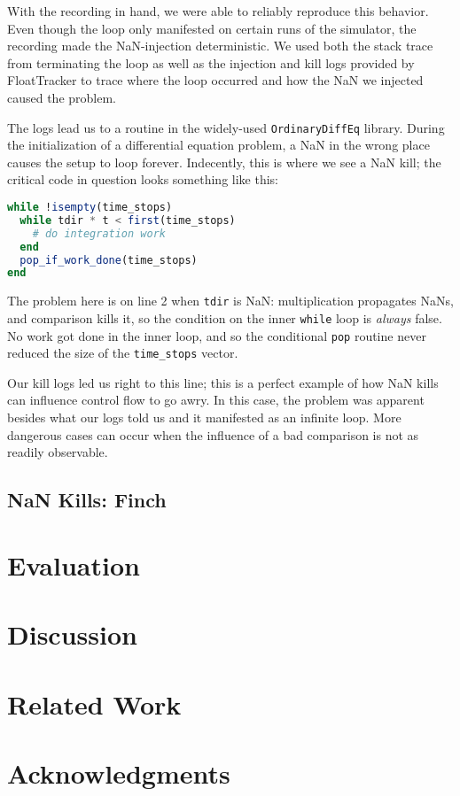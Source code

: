 \documentclass{juliacon}
\begin{document}
With the recording in hand, we were able to reliably reproduce this behavior.
Even though the loop only manifested on certain runs of the simulator, the recording made the NaN-injection deterministic.
We used both the stack trace from terminating the loop as well as the injection and kill logs provided by FloatTracker to trace where the loop occurred and how the NaN we injected caused the problem.


The logs lead us to a routine in the widely-used \texttt{OrdinaryDiffEq} library.
During the initialization of a differential equation problem, a NaN in the wrong place causes the setup to loop forever.
Indecently, this is where we see a NaN kill; the critical code in question looks something like this:

\begin{lstlisting}[language = Julia]
while !isempty(time_stops)
  while tdir * t < first(time_stops)
    # do integration work
  end
  pop_if_work_done(time_stops)
end
\end{lstlisting}

The problem here is on line 2 when \texttt{tdir} is NaN: multiplication propagates NaNs, and comparison kills it, so the condition on the inner \texttt{while} loop is \emph{always} false.
No work got done in the inner loop, and so the conditional \texttt{pop} routine never reduced the size of the \texttt{time\_stops} vector.

Our kill logs led us right to this line; this is a perfect example of how NaN kills can influence control flow to go awry.
In this case, the problem was apparent besides what our logs told us and it manifested as an infinite loop.
More dangerous cases can occur when the influence of a bad comparison is not as readily observable.

\subsection{NaN Kills: Finch}


\section{Evaluation}

\section{Discussion}

\section{Related Work}

\section{Acknowledgments}


\end{document}
